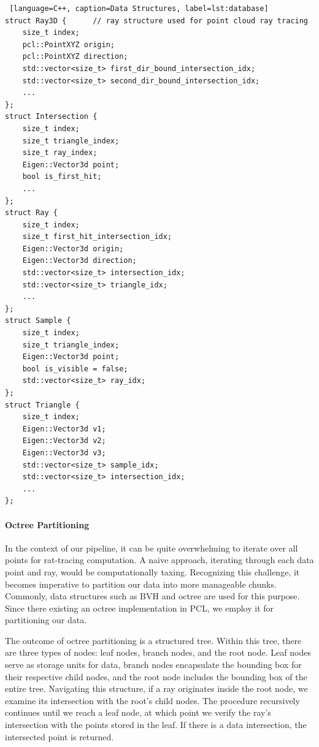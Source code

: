 \documentclass[11pt, a4paper,oneside,chapterprefix=false]{scrbook}
\begin{document}
\begin{lstlisting} [language=C++, caption=Data Structures, label=lst:database]
struct Ray3D {      // ray structure used for point cloud ray tracing
    size_t index;
    pcl::PointXYZ origin;
    pcl::PointXYZ direction;
    std::vector<size_t> first_dir_bound_intersection_idx;
    std::vector<size_t> second_dir_bound_intersection_idx;
    ...
};
struct Intersection {
    size_t index;
    size_t triangle_index;
    size_t ray_index;
    Eigen::Vector3d point;
    bool is_first_hit;
    ...
};
struct Ray { 
    size_t index;
    size_t first_hit_intersection_idx;
    Eigen::Vector3d origin;
    Eigen::Vector3d direction;
    std::vector<size_t> intersection_idx;
    std::vector<size_t> triangle_idx;
    ...
};
struct Sample {
    size_t index;
    size_t triangle_index;
    Eigen::Vector3d point;
    bool is_visible = false;
    std::vector<size_t> ray_idx;
};
struct Triangle {
    size_t index;
    Eigen::Vector3d v1;
    Eigen::Vector3d v2;
    Eigen::Vector3d v3;
    std::vector<size_t> sample_idx;
    std::vector<size_t> intersection_idx;
    ...
};

\end{lstlisting}

\paragraph{Octree Partitioning}

In the context of our pipeline, it can be quite overwhelming to iterate over all points for rat-tracing computation. A naive approach, iterating through each data point and ray, would be computationally taxing. Recognizing this challenge, it becomes imperative to partition our data into more manageable chunks. Commonly, data structures such as BVH \cite{ERICSON2005235} and octree \cite{octree} are used for this purpose. Since there existing an octree implementation in PCL, we employ it for partitioning our data.

\vspace{10pt}

The outcome of octree partitioning is a structured tree. Within this tree, there are three types of nodes: leaf nodes, branch nodes, and the root node. Leaf nodes serve as storage units for data, branch nodes encapsulate the bounding box for their respective child nodes, and the root node includes the bounding box of the entire tree. Navigating this structure, if a ray originates inside the root node, we examine its intersection with the root's child nodes. The procedure recursively continues until we reach a leaf node, at which point we verify the ray's intersection with the points stored in the leaf. If there is a data intersection, the intersected point is returned. 
\end{document}
